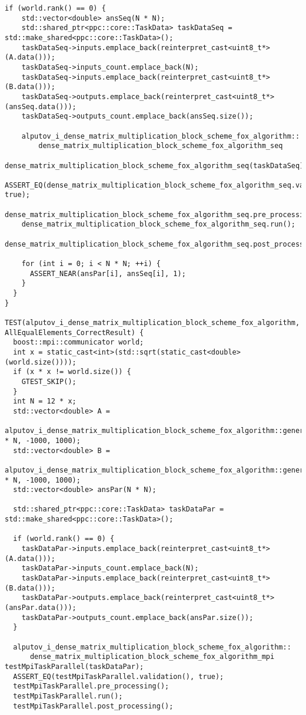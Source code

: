 \documentclass{report}
\begin{document}
\begin{lstlisting}[caption={main.cpp(func tests)},label=lst:opsmpi2]
  if (world.rank() == 0) {
    std::vector<double> ansSeq(N * N);
    std::shared_ptr<ppc::core::TaskData> taskDataSeq = std::make_shared<ppc::core::TaskData>();
    taskDataSeq->inputs.emplace_back(reinterpret_cast<uint8_t*>(A.data()));
    taskDataSeq->inputs_count.emplace_back(N);
    taskDataSeq->inputs.emplace_back(reinterpret_cast<uint8_t*>(B.data()));
    taskDataSeq->outputs.emplace_back(reinterpret_cast<uint8_t*>(ansSeq.data()));
    taskDataSeq->outputs_count.emplace_back(ansSeq.size());

    alputov_i_dense_matrix_multiplication_block_scheme_fox_algorithm::
        dense_matrix_multiplication_block_scheme_fox_algorithm_seq
            dense_matrix_multiplication_block_scheme_fox_algorithm_seq(taskDataSeq);
    ASSERT_EQ(dense_matrix_multiplication_block_scheme_fox_algorithm_seq.validation(), true);
    dense_matrix_multiplication_block_scheme_fox_algorithm_seq.pre_processing();
    dense_matrix_multiplication_block_scheme_fox_algorithm_seq.run();
    dense_matrix_multiplication_block_scheme_fox_algorithm_seq.post_processing();

    for (int i = 0; i < N * N; ++i) {
      ASSERT_NEAR(ansPar[i], ansSeq[i], 1);
    }
  }
}

TEST(alputov_i_dense_matrix_multiplication_block_scheme_fox_algorithm, AllEqualElements_CorrectResult) {
  boost::mpi::communicator world;
  int x = static_cast<int>(std::sqrt(static_cast<double>(world.size())));
  if (x * x != world.size()) {
    GTEST_SKIP();
  }
  int N = 12 * x;
  std::vector<double> A =
      alputov_i_dense_matrix_multiplication_block_scheme_fox_algorithm::generator(N * N, -1000, 1000);
  std::vector<double> B =
      alputov_i_dense_matrix_multiplication_block_scheme_fox_algorithm::generator(N * N, -1000, 1000);
  std::vector<double> ansPar(N * N);

  std::shared_ptr<ppc::core::TaskData> taskDataPar = std::make_shared<ppc::core::TaskData>();

  if (world.rank() == 0) {
    taskDataPar->inputs.emplace_back(reinterpret_cast<uint8_t*>(A.data()));
    taskDataPar->inputs_count.emplace_back(N);
    taskDataPar->inputs.emplace_back(reinterpret_cast<uint8_t*>(B.data()));
    taskDataPar->outputs.emplace_back(reinterpret_cast<uint8_t*>(ansPar.data()));
    taskDataPar->outputs_count.emplace_back(ansPar.size());
  }

  alputov_i_dense_matrix_multiplication_block_scheme_fox_algorithm::
      dense_matrix_multiplication_block_scheme_fox_algorithm_mpi testMpiTaskParallel(taskDataPar);
  ASSERT_EQ(testMpiTaskParallel.validation(), true);
  testMpiTaskParallel.pre_processing();
  testMpiTaskParallel.run();
  testMpiTaskParallel.post_processing();


\end{lstlisting}
\end{document}
